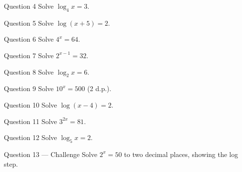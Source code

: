 \documentclass[11pt]{article}
\begin{document}
\begin{qbox}{Question 4}
Solve $\log_4 x=3$.\workspace{2.4cm}
\end{qbox}

\begin{qbox}{Question 5}
Solve $\log(x+5)=2$.\workspace{2.4cm}
\end{qbox}

\begin{qbox}{Question 6}
Solve $4^x=64$.\workspace{2.4cm}
\end{qbox}

\begin{qbox}{Question 7}
Solve $2^{x-1}=32$.\workspace{2.4cm}
\end{qbox}

\begin{qbox}{Question 8}
Solve $\log_2 x=6$.\workspace{2.4cm}
\end{qbox}

\begin{qbox}{Question 9}
Solve $10^x=500$ (2 d.p.).\workspace{2.4cm}
\end{qbox}

\begin{qbox}{Question 10}
Solve $\log(x-4)=2$.\workspace{2.4cm}
\end{qbox}

\begin{qbox}{Question 11}
Solve $3^{2x}=81$.\workspace{2.4cm}
\end{qbox}

\begin{qbox}{Question 12}
Solve $\log_5 x=2$.\workspace{2.4cm}
\end{qbox}

\begin{qbox}{Question 13 --- Challenge}
Solve $2^{x}=50$ to two decimal places, showing the log step.\workspace{3cm}
\end{qbox}

\clearpage
{}
\end{document}
